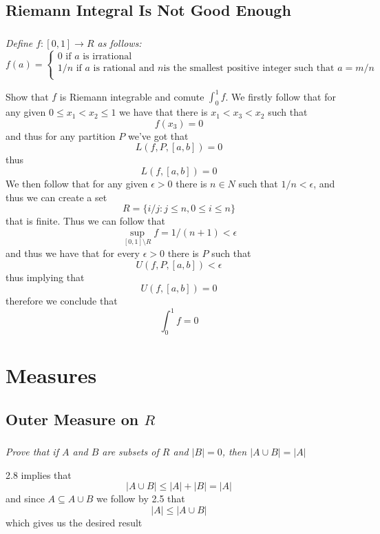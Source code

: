 \documentclass[11pt,oneside,titlepage]{book}
\newcommand{\set}[1]{\{ #1 \}}
\begin{document}
\section{Riemann Integral Is Not Good Enough}

\subsection{}

\textit{Define $f: [0, 1] \to R$ as follows:
$$ f(a) = 
\begin{cases}
  0 \text{ if } a \text{ is irrational} \\
  1/n \text{ if } a \text{ is rational and } n \text{
  is the smallest positive integer such that } a = m/n \\
\end{cases}
$$}

Show that $f$ is Riemann integrable and comute $\int_0^1{f}$. We
firstly follow that for any given $0 \leq x_1 < x_2 \leq 1$ we have that
there is $x_1 < x_3 < x_2$ such that
$$f(x_3) = 0$$
and thus for any partition $P$ we've got that
$$L(f, P, [a, b]) = 0$$
thus
$$L(f, [a, b]) = 0$$
We then follow that for any given $\epsilon > 0$ there is $n \in N$
such that $1/n < \epsilon$, and thus we can create a set
$$R = \set{i/j: j \leq n, 0 \leq i \leq n}$$
that is finite. Thus we can follow that
$$\sup_{[0, 1] \setminus R}{f} = 1/(n + 1) < \epsilon$$
and thus we have that for every $\epsilon > 0$ there is $P$ such that
$$U(f, P, [a, b]) < \epsilon$$
thus implying that
$$U(f, [a, b]) = 0$$
therefore we conclude that
$$\int_0^1{f} = 0$$

\chapter{Measures}

\section{Outer Measure on $R$}

\subsection{}

\textit{Prove that if $A$ and $B$ are subsets of $R$ and $|B| = 0$,
  then $|A \cup B| = |A|$}

2.8 implies that
$$|A \cup B| \leq |A| + |B| = |A|$$
and since $A \subseteq A \cup B$ we follow by 2.5 that
$$|A| \leq |A \cup B|$$
which gives us the desired result
\end{document}

